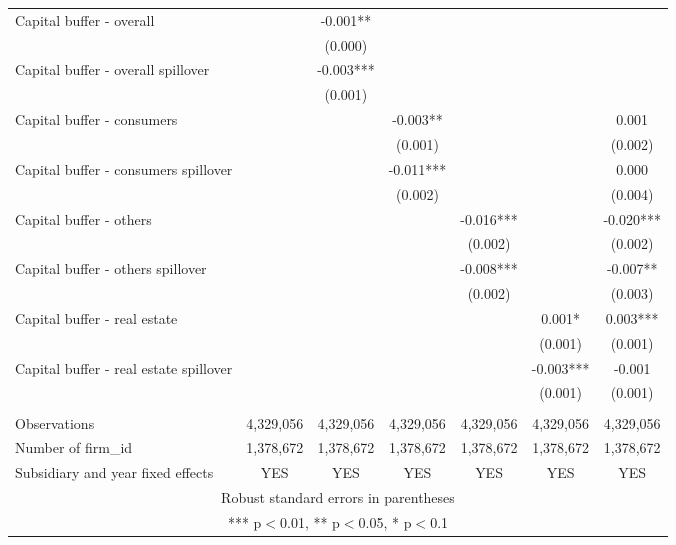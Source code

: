 \begin{tabular}{lcccccc}
Capital buffer - overall &  & -0.001** &  &  &  &  \\
 &  & (0.000) &  &  &  &  \\
Capital buffer - overall spillover &  & -0.003*** &  &  &  &  \\
 &  & (0.001) &  &  &  &  \\
Capital buffer - consumers &  &  & -0.003** &  &  & 0.001 \\
 &  &  & (0.001) &  &  & (0.002) \\
Capital buffer - consumers spillover &  &  & -0.011*** &  &  & 0.000 \\
 &  &  & (0.002) &  &  & (0.004) \\
Capital buffer - others &  &  &  & -0.016*** &  & -0.020*** \\
 &  &  &  & (0.002) &  & (0.002) \\
Capital buffer - others spillover &  &  &  & -0.008*** &  & -0.007** \\
 &  &  &  & (0.002) &  & (0.003) \\
Capital buffer - real estate &  &  &  &  & 0.001* & 0.003*** \\
 &  &  &  &  & (0.001) & (0.001) \\
Capital buffer - real estate spillover &  &  &  &  & -0.003*** & -0.001 \\
 &  &  &  &  & (0.001) & (0.001) \\
 &  &  &  &  &  &  \\
Observations & 4,329,056 & 4,329,056 & 4,329,056 & 4,329,056 & 4,329,056 & 4,329,056 \\
Number of firm\_id & 1,378,672 & 1,378,672 & 1,378,672 & 1,378,672 & 1,378,672 & 1,378,672 \\
 Subsidiary and year fixed effects & YES & YES & YES & YES & YES & YES \\ \hline
\multicolumn{7}{c}{ Robust standard errors in parentheses} \\
\multicolumn{7}{c}{ *** p$<$0.01, ** p$<$0.05, * p$<$0.1} \\
\end{tabular}
